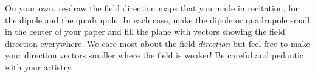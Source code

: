 \documentclass[12pt]{article}
\begin{document}
\startproblem%
On your own, re-draw the field direction maps that you made in
recitation, for the dipole and the quadrupole.
In each case, make the dipole or quadrupole small in the center of your paper and
fill the plane with vectors showing the field direction everywhere.
We care most about the field \emph{direction} but feel free to make
your direction vectors smaller where the field is weaker!
Be careful and pedantic with your artistry.
\end{document}

